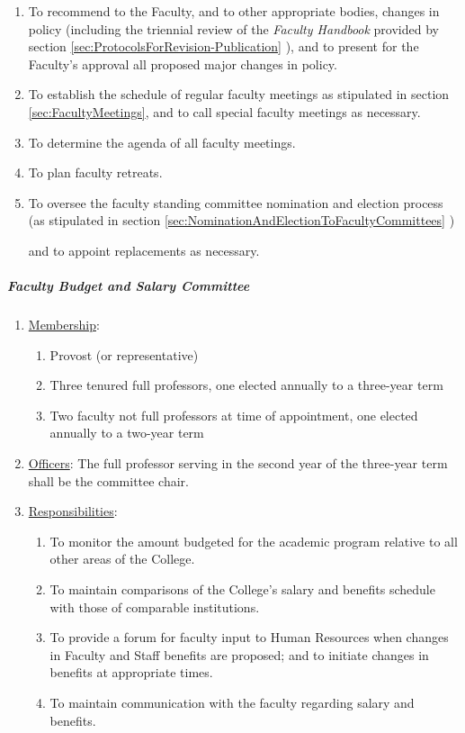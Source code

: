 \begin{enumerate}[label=\alph*)]
{\begin{enumerate}[label=\arabic*)]
								\item{To recommend to the Faculty, and to other appropriate bodies, changes in policy (including the triennial review of the \emph{Faculty Handbook} provided by
									section
									\ref{sec:ProtocolsForRevision-Publication}
									), and to present for the Faculty's approval all proposed major changes in policy.}
								\item{To establish the schedule of regular faculty meetings as stipulated in
									section
									\ref{sec:FacultyMeetings}, and to call special faculty meetings as necessary.}
								\item{To determine the agenda of all faculty meetings.}
								\item{To plan faculty retreats.}
								\item{To oversee the faculty standing committee nomination and election process (as stipulated in
									section
									\ref{sec:NominationAndElectionToFacultyCommittees}
									)

									and to appoint replacements as necessary.}
							\end{enumerate}
						}
					\end{enumerate}
				\subparagraph{Faculty Budget and Salary Committee}
					\begin{enumerate}[label=\alph*)]
						\item{\underline{Membership}:
							\begin{enumerate}[label=\arabic*)]
								\item{Provost (or representative)}
								\item{Three tenured full professors, one elected annually to a three-year term}
								\item{Two faculty not full professors at time of appointment, one elected annually to a two-year term}
							\end{enumerate}
						}
						\item{\underline{Officers}:
							The full professor serving in the second year of the three-year term shall be the committee chair.
						}
						\item{\underline{Responsibilities}:
							\begin{enumerate}[label=\arabic*)]
								\item{To monitor the amount budgeted for the academic program relative to all other areas of the College.}
								\item{To maintain comparisons of the College's salary and benefits schedule with those of comparable institutions.}
								\item{To provide a forum for faculty input to Human Resources when changes in Faculty and Staff benefits are proposed; and to initiate changes in benefits at appropriate times.}
								\item{To maintain communication with the faculty regarding salary and benefits.}
							\end{enumerate}
						}
					\end{enumerate}
